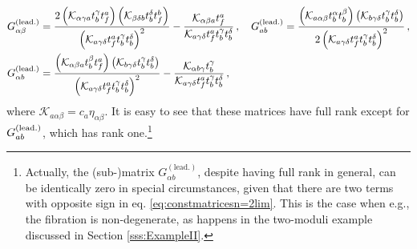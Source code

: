 \begin{align}\label{eq:constmatricesn=2lim}
	\notag G^{(\text{lead.})}_{\alpha \beta} &=\frac{2 \left(\mathcal{K}_{\alpha \gamma a} t_b^{\gamma} t^a_f\right) \left( \mathcal{K}_{\beta \delta b} t_b^{\delta} t^b_f\right)}{\left( \mathcal{K}_{a \gamma \delta} t^a_f t_b^{\gamma} t_b^{\delta} \right)^2} - \frac{\mathcal{K}_{\alpha \beta a} t^a_f}{\mathcal{K}_{a \gamma \delta} t^a_f t_b^{\gamma} t_b^{\delta}}\, , \quad G^{(\text{lead.})}_{a b} =\frac{\left(\mathcal{K}_{a \alpha \beta} t_b^{\alpha} t_b^{\beta}\right) \left( \mathcal{K}_{b \gamma \delta} t_b^{\gamma} t_b^{\delta}\right)}{2\left( \mathcal{K}_{a \gamma \delta} t^a_f t_b^{\gamma} t_b^{\delta} \right)^2}\, ,\\
    G^{(\text{lead.})}_{\alpha b} &=\frac{\left(\mathcal{K}_{\alpha \beta a} t_b^{\beta} t^a_f\right) \left( \mathcal{K}_{b \gamma \delta} t_b^{\gamma} t_b^{\delta}\right)}{\left( \mathcal{K}_{a \gamma \delta} t^a_f t_b^{\gamma} t_b^{\delta} \right)^2} - \frac{\mathcal{K}_{\alpha b \gamma} t_b^{\gamma}}{\mathcal{K}_{a \gamma \delta} t^a_f t_b^{\gamma} t_b^{\delta}}\, ,
\end{align}
%
where $\mathcal{K}_{a \alpha \beta} = c_a \eta_{\alpha \beta}$. It is easy to see that these matrices have full rank except for $G^{(\rm lead.)}_{a b}$, which has rank one.\footnote{Actually, the (sub-)matrix $G^{(\text{lead.})}_{\alpha b}$, despite having full rank in general, can be identically zero in special circumstances, given that there are two terms with opposite sign in eq. \eqref{eq:constmatricesn=2lim}. This is the case when e.g., the fibration is non-degenerate, as happens in the two-moduli example discussed in Section \ref{sss:ExampleII}.}
	

